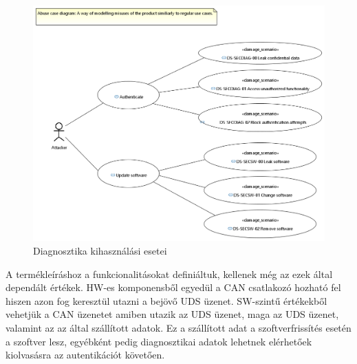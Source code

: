 \begin{figure}[!ht]
	\centering
	\includegraphics[width=120mm, keepaspectratio]{figures/06_01_abuse_case_diagram.PNG}
	\caption{Diagnosztika kihasználási esetei}
	\label{fig:diag_abuse}
\end{figure}

A termékleíráshoz a funkcionalitásokat definiáltuk, kellenek még az ezek által dependált értékek. HW-es komponensből egyedül a CAN csatlakozó hozható fel hiszen azon fog keresztül utazni a bejövő UDS üzenet. SW-szintű értékekből vehetjük a CAN üzenetet amiben utazik az UDS üzenet, maga az UDS üzenet, valamint az az által szállított adatok. Ez a szállított adat a szoftverfrissítés esetén a szoftver lesz, egyébként pedig diagnosztikai adatok lehetnek elérhetőek kiolvasásra az autentikációt követően.

